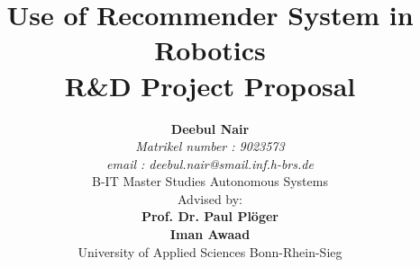 \documentclass[a4paper, 10pt]{report}   %
\begin{document}
\title{ \fontsize{10mm}{25mm}\textbf{Use of Recommender System in Robotics}\\
		 \vspace{20 mm} 
		 {R\&D Project Proposal} \\
		}   %




\author{\textbf{Deebul Nair} \\
			\textit{Matrikel number : 9023573}\\
					 \vspace{2 mm} 
			\textit{email : deebul.nair@smail.inf.h-brs.de}\\
					 \vspace{50 mm} 
		{B-IT Master Studies Autonomous Systems}\\
			{Advised by:}\\
			\textbf{Prof. Dr. Paul Pl{\"o}ger}\\
			\textbf{Iman Awaad}\\
		{University of Applied Sciences Bonn-Rhein-Sieg}
		}         %




\maketitle
\end{document}
